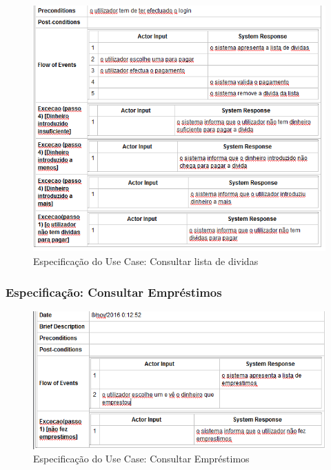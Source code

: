 \begin{figure}[htb!]
	\centering
	\includegraphics[scale=0.7]{imagens/Especificacoes/consultarlistadedividas}  
	\caption{Especificação do Use Case: Consultar lista de dividas}  
\end{figure}

\subsubsection{Especificação: Consultar Empréstimos }

\begin{figure}[htb!]
	\centering
	\includegraphics[scale=0.7]{imagens/Especificacoes/consultaremprestimos}  
	\caption{Especificação do Use Case: Consultar Empréstimos}  
\end{figure}

